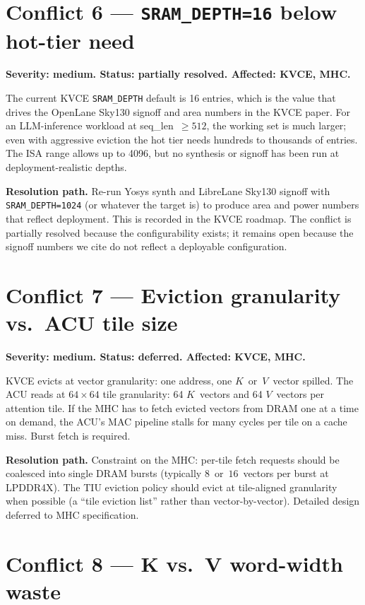 \documentclass[11pt]{article}
\begin{document}
\section{Conflict 6 --- \texttt{SRAM\_DEPTH=16} below hot-tier need}
\label{sec:c6}

\textbf{Severity: medium. Status: partially resolved. Affected: KVCE, MHC.}

The current KVCE \texttt{SRAM\_DEPTH} default is 16 entries, which
is the value that drives the OpenLane Sky130 signoff and area
numbers in the KVCE paper. For an LLM-inference workload at
seq\_len~$\geq 512$, the working set is much larger; even with
aggressive eviction the hot tier needs hundreds to thousands of
entries. The ISA range allows up to 4096, but no synthesis or
signoff has been run at deployment-realistic depths.

\textbf{Resolution path.} Re-run Yosys synth and LibreLane Sky130
signoff with \texttt{SRAM\_DEPTH=1024} (or whatever the target is)
to produce area and power numbers that reflect deployment.
This is recorded in the KVCE roadmap. The conflict is partially
resolved because the configurability exists; it remains open
because the signoff numbers we cite do not reflect a deployable
configuration.

\section{Conflict 7 --- Eviction granularity vs.\ ACU tile size}
\label{sec:c7}

\textbf{Severity: medium. Status: deferred. Affected: KVCE, MHC.}

KVCE evicts at vector granularity: one address, one
$K$~or~$V$~vector spilled. The ACU reads at $64 \times 64$ tile
granularity: 64 $K$~vectors and 64 $V$~vectors per attention tile.
If the MHC has to fetch evicted vectors from DRAM one at a time
on demand, the ACU's MAC pipeline stalls for many cycles per tile
on a cache miss. Burst fetch is required.

\textbf{Resolution path.} Constraint on the MHC: per-tile fetch
requests should be coalesced into single DRAM bursts (typically
$8$~or~$16$~vectors per burst at LPDDR4X). The TIU eviction policy
should evict at tile-aligned granularity when possible (a ``tile
eviction list'' rather than vector-by-vector). Detailed design
deferred to MHC specification.

\section{Conflict 8 --- K vs.\ V word-width waste}
\label{sec:c8}
\end{document}
